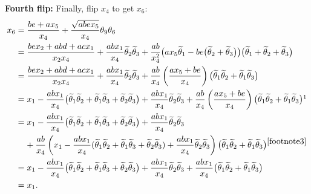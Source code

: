 {\textbf{Fourth flip:} Finally, flip $x_4$ to get $x_6$:
\begin{align*}
 x_6 &= \frac{be + ax_5}{x_4} + \frac{\sqrt{abex_5}}{x_4} \theta_9 \theta_6
 \\&= \frac{bex_2 + abd + acx_1}{x_2 x_4}+\frac{abx_1}{x_4} \widetilde{\theta}_2 \widetilde{\theta}_3
 + \frac{ab}{x_4^2} \big( a x_5 \widetilde{\theta}_1 - be \big(\widetilde{\theta}_2 + \widetilde{\theta}_3\big)\big)
 \big(\widetilde{\theta}_1 + \widetilde{\theta}_2 + \widetilde{\theta}_3\big) \\
 &={ \frac{bex_2 + abd + acx_1}{x_2 x_4} + \frac{abx_1}{x_4} \widetilde{\theta}_2 \widetilde{\theta}_3
 + \frac{ab}{x_4} \left( \frac{a x_5 + be}{x_4}\right) \big(\widetilde{\theta}_1 \widetilde{\theta}_2 + \widetilde{\theta}_1 \widetilde{\theta}_3\big) } \\
 &= { x_1 - \frac{abx_1}{x_4} \big(\widetilde{\theta}_1 \widetilde{\theta}_2 + \widetilde{\theta}_1 \widetilde{\theta}_3 + \widetilde{\theta}_2 \widetilde{\theta}_3 \big) + \frac{abx_1}{x_4} \widetilde{\theta}_2 \widetilde{\theta}_3
 + \frac{ab}{x_4} \left( \frac{a x_5 + be}{x_4}\right)
 \big(\widetilde{\theta}_1 \widetilde{\theta}_2 + \widetilde{\theta}_1 \widetilde{\theta}_3\big)} \footnotemark \\
 &= { x_1 - \frac{abx_1}{x_4} \big(\widetilde{\theta}_1 \widetilde{\theta}_2 + \widetilde{\theta}_1 \widetilde{\theta}_3 + \widetilde{\theta}_2 \widetilde{\theta}_3 \big) + \frac{abx_1}{x_4} \widetilde{\theta}_2 \widetilde{\theta}_3} \\
 &\phantom{=} \ {} + { \frac{ab}{x_4} \left(x_1 - \frac{abx_1}{x_4} (\widetilde{\theta}_1 \widetilde{\theta}_2 + \widetilde{\theta}_1 \widetilde{\theta}_3 + \widetilde{\theta}_2 \widetilde{\theta}_3) + \frac{abx_1}{x_4} \widetilde{\theta}_2 \widetilde{\theta}_3
\right)
 \big(\widetilde{\theta}_1 \widetilde{\theta}_2 + \widetilde{\theta}_1 \widetilde{\theta}_3\big)} {}^{\ref{footnote3}} \\
 &= {x_1 - \frac{abx_1}{x_4} \big(\widetilde{\theta}_1 \widetilde{\theta}_2 + \widetilde{\theta}_1 \widetilde{\theta}_3 + \widetilde{\theta}_2 \widetilde{\theta}_3 \big) + \frac{abx_1}{x_4} \widetilde{\theta}_2 \widetilde{\theta}_3
 + \frac{abx_1 }{x_4} \big(\widetilde{\theta}_1 \widetilde{\theta}_2 + \widetilde{\theta}_1 \widetilde{\theta}_3\big)} \\
 &= x_1.
\end{align*}
}
